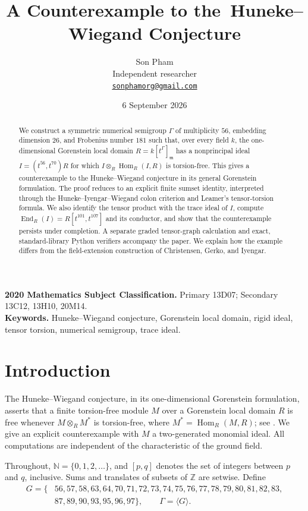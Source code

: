 \documentclass[11pt,letterpaper]{article}
\title{A Counterexample to the\ Huneke--Wiegand Conjecture}
\author{Son Pham\\[2pt]\small Independent researcher\\\small\href{mailto:sonphamorg@gmail.com}{\texttt{sonphamorg@gmail.com}}}
\date{6 September 2026}
\theoremstyle{remark}
\newcommand{\NN}{\mathbb N}
\newcommand{\ZZ}{\mathbb Z}
\newcommand{\m}{\mathfrak m}
\newcommand{\End}{\operatorname{End}}
\newcommand{\Hom}{\operatorname{Hom}}
\numberwithin{equation}{section}
\begin{document}
\maketitle
\begin{abstract}
We construct a symmetric numerical semigroup $\Gamma$ of multiplicity $56$, embedding dimension $26$, and Frobenius number $181$ such that, over every field $k$, the one-dimensional Gorenstein local domain $R=k[t^\Gamma]_{\m}$ has a nonprincipal ideal $I=(t^{56},t^{70})R$ for which $I\otimes_R\Hom_R(I,R)$ is torsion-free. This gives a counterexample to the Huneke--Wiegand conjecture in its general Gorenstein formulation. The proof reduces to an explicit finite sumset identity, interpreted through the Huneke--Iyengar--Wiegand colon criterion and Leamer's tensor-torsion formula. We also identify the tensor product with the trace ideal of $I$, compute $\End_R(I)=R[t^{101},t^{107}]$ and its conductor, and show that the counterexample persists under completion. A separate graded tensor-graph calculation and exact, standard-library Python verifiers accompany the paper. We explain how the example differs from the field-extension construction of Christensen, Gerko, and Iyengar.
\end{abstract}
\noindent\small\textbf{2020 Mathematics Subject Classification.} Primary 13D07; Secondary 13C12, 13H10, 20M14.\\
\textbf{Keywords.} Huneke--Wiegand conjecture, Gorenstein local domain, rigid ideal, tensor torsion, numerical semigroup, trace ideal.\normalsize

\section{Introduction}
The Huneke--Wiegand conjecture, in its one-dimensional Gorenstein formulation, asserts that a finite torsion-free module $M$ over a Gorenstein local domain $R$ is free whenever $M\otimes_R M^*$ is torsion-free, where $M^*=\Hom_R(M,R)$; see \cite{HW,HWcorr,HIW}. We give an explicit counterexample with $M$ a two-generated monomial ideal. All computations are independent of the characteristic of the ground field.

Throughout, $\NN=\{0,1,2,\ldots\}$, and $[p,q]$ denotes the set of integers between $p$ and $q$, inclusive. Sums and translates of subsets of $\ZZ$ are setwise. Define
\begin{equation}\label{eq:G}
\begin{split}
G=\{&56,57,58,63,64,70,71,72,73,74,75,76,77,78,79,80,81,82,83,\\
&87,89,90,93,95,96,97\},\qquad \Gamma=\langle G\rangle.
\end{split}
\end{equation}
\end{document}
